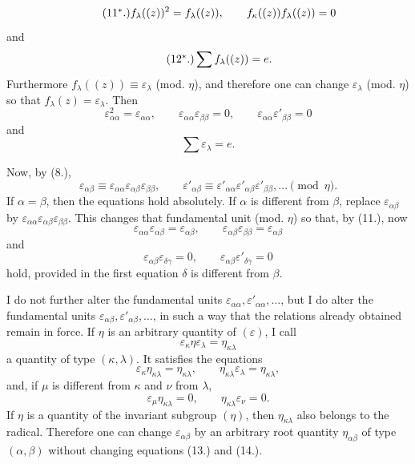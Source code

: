 \documentclass[11pt]{article}
\newcommand{\eps}{\varepsilon}
\begin{document}
\begin{equation}\tag{11$^{*}$.}
 f_\lambda((z))^2=f_\lambda((z)),
 \qquad
 f_\kappa((z))f_\lambda((z))=0
\end{equation}
and
\begin{equation}\tag{12$^{*}$.}
 \sum f_\lambda((z))=e.
\end{equation}
Furthermore $f_\lambda((z))\equiv \eps_\lambda$ (mod. $\eta$), and therefore one can change $\eps_\lambda$ (mod. $\eta$) so that $f_\lambda(z)=\eps_\lambda$. Then
\begin{equation}\tag{11.}
 \eps_{\alpha\alpha}^2=\eps_{\alpha\alpha},
 \qquad
 \eps_{\alpha\alpha}\eps_{\beta\beta}=0,
 \qquad
 \eps_{\alpha\alpha}\eps'_{\beta\beta}=0
\end{equation}
and
\begin{equation}\tag{12.}
 \sum \eps_\lambda=e.
\end{equation}

Now, by (8.),
\[
 \eps_{\alpha\beta}\equiv\eps_{\alpha\alpha}\eps_{\alpha\beta}\eps_{\beta\beta},
 \qquad
 \eps'_{\alpha\beta}\equiv\eps'_{\alpha\alpha}\eps'_{\alpha\beta}\eps'_{\beta\beta},\ldots
 \pmod{\eta}.
\]
If $\alpha=\beta$, then the equations hold absolutely. If $\alpha$ is different from $\beta$, replace $\eps_{\alpha\beta}$ by $\eps_{\alpha\alpha}\eps_{\alpha\beta}\eps_{\beta\beta}$. This changes that fundamental unit (mod. $\eta$) so that, by (11.), now
\begin{equation}\tag{13.}
 \eps_{\alpha\alpha}\eps_{\alpha\beta}=\eps_{\alpha\beta},
 \qquad
 \eps_{\alpha\beta}\eps_{\beta\beta}=\eps_{\alpha\beta}
\end{equation}
and
\begin{equation}\tag{14.}
 \eps_{\alpha\beta}\eps_{\delta\gamma}=0,
 \qquad
 \eps_{\alpha\beta}\eps'_{\delta\gamma}=0
\end{equation}
hold, provided in the first equation $\delta$ is different from $\beta$.

I do not further alter the fundamental units $\eps_{\alpha\alpha},\eps'_{\alpha\alpha},\ldots$, but I do alter the fundamental units $\eps_{\alpha\beta},\eps'_{\alpha\beta},\ldots$, in such a way that the relations already obtained remain in force. If $\eta$ is an arbitrary quantity of $(\eps)$, I call
\begin{equation}\tag{15.}
 \eps_\kappa\eta\eps_\lambda=\eta_{\kappa\lambda}
\end{equation}
a quantity of type $(\kappa,\lambda)$. It satisfies the equations
\begin{equation}\tag{16.}
 \eps_\kappa\eta_{\kappa\lambda}=\eta_{\kappa\lambda},
 \qquad
 \eta_{\kappa\lambda}\eps_\lambda=\eta_{\kappa\lambda},
\end{equation}
and, if $\mu$ is different from $\kappa$ and $\nu$ from $\lambda$,
\begin{equation}\tag{17.}
 \eps_\mu\eta_{\kappa\lambda}=0,
 \qquad
 \eta_{\kappa\lambda}\eps_\nu=0.
\end{equation}
If $\eta$ is a quantity of the invariant subgroup $(\eta)$, then $\eta_{\kappa\lambda}$ also belongs to the radical. Therefore one can change $\eps_{\alpha\beta}$ by an arbitrary root quantity $\eta_{\alpha\beta}$ of type $(\alpha,\beta)$ without changing equations (13.) and (14.).
\end{document}
